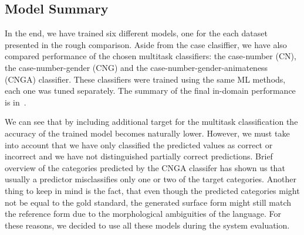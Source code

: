 
\subsection{Model Summary}

In the end, we have trained six different models, one for the each dataset presented in the rough comparison.
Aside from the case clasiffier, we have also compared performance of the chosen multitask classifiers:
the case-number (CN), the case-number-gender (CNG) and the case-number-gender-animateness (CNGA)
classifier. These classifiers were trained using the same ML methods, each one was tuned separately.
The summary of the final in-domain performance is in~.

We can see that by including additional target for the multitask classification the accuracy of the trained
model becomes naturally lower. However, we must take into account that we have only classified the predicted
values as correct or incorrect and we have not distinguished partially correct predictions. Brief overview
of the categories predicted by the CNGA classifer has shown us that usually a predictor misclassifies only
one or two of the target categories. Another thing to keep in mind is the fact, that even though the predicted
categories might not be equal to the gold standard, the generated surface form might still match the reference form
due to the morphological ambiguities of the language. For these reasons, we decided to use all these models during the system evaluation.



